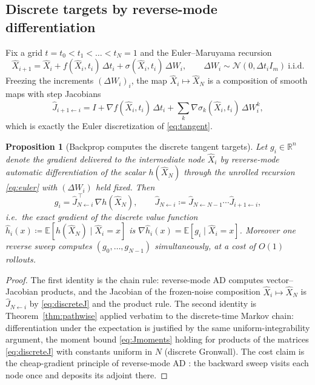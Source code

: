 \documentclass[11pt]{article}
\newtheorem{proposition}[theorem]{Proposition}
\theoremstyle{definition}
\theoremstyle{remark}
\newcommand{\R}{\mathbb{R}}
\newcommand{\E}{\mathbb{E}}
\newcommand{\grad}{\nabla}
\begin{document}
\subsection{Discrete targets by reverse-mode differentiation}\label{sec:discrete0}

Fix a grid $t = t_0 < t_1 < \dots < t_N = 1$ and the Euler--Maruyama recursion
\begin{equation}\label{eq:euler}
\widehat X_{i+1} = \widehat X_i + f(\widehat X_i,t_i)\,\Delta t_i
+ \sigma(\widehat X_i,t_i)\,\Delta W_i,
\qquad \Delta W_i \sim \mathcal N(0,\Delta t_i I_m)\ \text{i.i.d.}
\end{equation}
Freezing the increments $(\Delta W_i)_i$, the map $\widehat X_i \mapsto \widehat X_N$ is a
composition of smooth maps with step Jacobians
\begin{equation}\label{eq:discreteJ}
\widehat J_{i+1\leftarrow i}
= I + \grad f(\widehat X_i,t_i)\,\Delta t_i
+ \sum_k \grad\sigma_k(\widehat X_i,t_i)\,\Delta W^k_i ,
\end{equation}
which is exactly the Euler discretization of \eqref{eq:tangent}.

\begin{proposition}[Backprop computes the discrete tangent targets]\label{prop:vjp}
Let $g_i \in \R^n$ denote the gradient delivered to the intermediate node $\widehat X_i$ by
reverse-mode automatic differentiation of the scalar $h(\widehat X_N)$ through the unrolled
recursion \eqref{eq:euler} with $(\Delta W_i)$ held fixed. Then
\[
g_i = \widehat J_{N\leftarrow i}^{\,\top}\,\grad h(\widehat X_N),
\qquad
\widehat J_{N\leftarrow i} \coloneqq \widehat J_{N\leftarrow N-1}\cdots
\widehat J_{i+1\leftarrow i},
\]
i.e.\ the exact gradient of the \emph{discrete} value function
$\widehat h_i(x) \coloneqq \E[h(\widehat X_N)\mid \widehat X_i = x]$ is
$\grad \widehat h_i(x) = \E[g_i \mid \widehat X_i = x]$. Moreover one reverse sweep computes
$(g_0,\dots,g_{N-1})$ simultaneously, at a cost of $O(1)$ rollouts.
\end{proposition}

\begin{proof}
The first identity is the chain rule: reverse-mode AD computes vector--Jacobian products, and
the Jacobian of the frozen-noise composition $\widehat X_i \mapsto \widehat X_N$ is
$\widehat J_{N\leftarrow i}$ by \eqref{eq:discreteJ} and the product rule. The second
identity is Theorem~\ref{thm:pathwise} applied verbatim to the discrete-time Markov chain:
differentiation under the expectation is justified by the same uniform-integrability
argument, the moment bound \eqref{eq:Jmoments} holding for products of the matrices
\eqref{eq:discreteJ} with constants uniform in $N$ (discrete Gronwall). The cost claim is the
cheap-gradient principle of reverse-mode AD \cite{GriewankWalther}: the backward sweep visits
each node once and deposits its adjoint there.
\end{proof}
\end{document}
